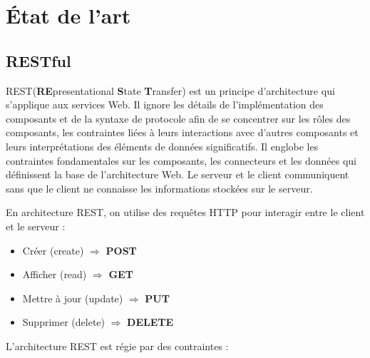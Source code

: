 \chapter{État de l'art}

\section{RESTful}

REST(\textbf{RE}presentational \textbf{S}tate \textbf{T}ransfer) \cite{Fie00} est un principe d'architecture qui s'applique aux services Web. Il ignore les détails de l'implémentation des composants et de la syntaxe de protocole afin de se concentrer sur les rôles des composants, les contraintes liées à leurs interactions avec d'autres composants et leurs interprétations des éléments de données significatifs. Il englobe les contraintes fondamentales sur les composants, les connecteurs et les données qui définissent la base de l'architecture Web. Le serveur et le client communiquent sans que le client ne connaisse les informations stockées sur le serveur.
\newline

\noindent
En architecture REST, on utilise des requêtes HTTP pour interagir entre le client et le serveur :
\begin{itemize}
    \item Créer (create) $\Rightarrow$ \textbf{POST}
    \item Afficher (read) $\Rightarrow$ \textbf{GET}
    \item Mettre à jour (update) $\Rightarrow$ \textbf{PUT}
    \item Supprimer (delete) $\Rightarrow$ \textbf{DELETE}
\end{itemize}

\noindent
L'architecture REST est régie par des contraintes :\newline

